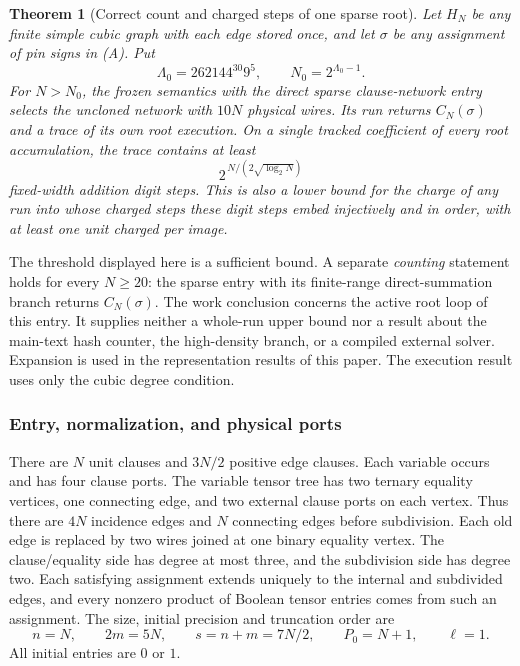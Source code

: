 \documentclass[
  11pt,
]{article}
\newtheorem{theorem}{Theorem}
\begin{document}
\begin{theorem}[Correct count and charged steps of one sparse root]
\label{thm:frozen-root-count-work}
Let \(H_N\) be any finite simple cubic graph with each edge stored once,
and let \(\sigma\) be any assignment of pin signs in \textup{(A)}. Put
\[
  \Lambda_0=262144^{30}9^5,\qquad N_0=2^{\Lambda_0-1}.
\]
For \(N>N_0\), the frozen semantics with the direct sparse
clause-network entry selects the uncloned network with \(10N\) physical
wires. Its run returns \(C_N(\sigma)\) and a trace of its own root
execution. On a single tracked coefficient of every root accumulation,
the trace contains at least
\[
                      2^{\,N/(2\sqrt{\log_2 N})}
\]
fixed-width addition digit steps. This is also a lower bound for the
charge of any run into whose charged steps these digit steps embed
injectively and in order, with at least one unit charged per image.
\end{theorem}

The threshold displayed here is a sufficient bound. A separate
\emph{counting} statement holds for every \(N\ge20\): the sparse entry with
its finite-range direct-summation branch returns \(C_N(\sigma)\).
The work conclusion concerns the active root loop of this entry.
It supplies neither a whole-run upper bound nor a result about the
main-text hash counter, the high-density branch, or a compiled external
solver. Expansion is used in the representation results of this paper.
The execution result uses only the cubic degree condition.

\subsubsection*{Entry, normalization, and physical ports}

There are \(N\) unit clauses and \(3N/2\) positive edge clauses. Each
variable occurs and has four clause ports. The variable tensor tree
has two ternary equality vertices, one connecting edge, and two
external clause ports on each vertex. Thus there are \(4N\) incidence
edges and \(N\) connecting edges before subdivision. Each old edge is
replaced by two wires joined at one binary equality vertex. The
clause/equality side has degree at most three, and the subdivision
side has degree two. Each satisfying assignment extends uniquely to
the internal and subdivided edges, and every nonzero product of
Boolean tensor entries comes from such an assignment. The size,
initial precision and truncation order are
\[
              n=N,\qquad 2m=5N,\qquad s=n+m=7N/2,\qquad
              P_0=N+1,\qquad \ell=1.
\]
All initial entries are \(0\) or \(1\).
\end{document}
